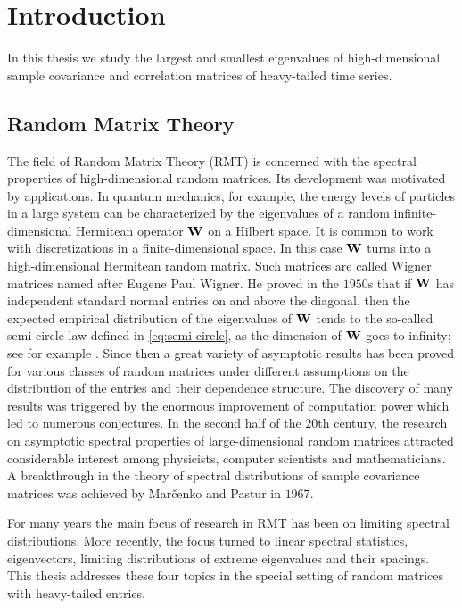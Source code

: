 \chapter{Introduction}\label{ch:intr}

In this thesis we study the largest and smallest eigenvalues of high-dimensional sample covariance and correlation matrices of heavy-tailed time series. 

\section{Random Matrix Theory}\label{sec:rmt}

The field of Random Matrix Theory (RMT) is concerned with the spectral properties of high-dimensional random matrices. Its development was motivated by applications.
In quantum mechanics, for example, the energy levels of particles in a large system can be characterized by the eigenvalues of a random infinite-dimensional Hermitean operator ${\mathbf W}$ on a Hilbert space. It is common to work with discretizations in a finite-dimensional space. In this case ${\mathbf W}$ turns into a high-dimensional Hermitean random matrix. Such matrices are called Wigner matrices named after Eugene Paul Wigner. He proved in the $1950$s that 
if ${\mathbf W}$ has independent standard normal entries on and above the diagonal, then
the expected empirical distribution of the eigenvalues of ${\mathbf W}$ tends to the so-called semi-circle law defined in \eqref{eq:semi-circle}, as the dimension of ${\mathbf W}$ goes to infinity; see for example \cite{wigner:1955,wigner:1957}. Since then a great variety of asymptotic results has been proved for various classes of random matrices under different assumptions on the distribution of the entries and their dependence structure. The discovery of many results was triggered by the enormous improvement of computation power which led to numerous conjectures. In the second half of the $20$th century, the research on asymptotic spectral properties of large-dimensional random matrices attracted considerable interest among physicists, computer scientists and mathematicians.  
A breakthrough in the theory of spectral distributions of sample covariance matrices was achieved by Mar\v cenko and Pastur in $1967$. 

For many years the main focus of research in RMT has been on limiting spectral distributions. More recently, the focus turned to linear spectral statistics, eigenvectors, limiting distributions of extreme eigenvalues and their spacings. This thesis addresses these four topics in the special setting of random matrices with  heavy-tailed entries.

